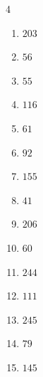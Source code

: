 \begin{multicols}{4}
\begin{enumerate}

  \item $203$


  \item $56$


  \item $55$


  \item $116$


  \item $61$


  \item $92$


  \item $155$


  \item $41$


  \item $206$


  \item $60$


  \item $244$


  \item $111$


\columnbreak %

\resetques

  \item $245$


  \item $79$


  \item $145$


\end{enumerate}
\end{multicols}
